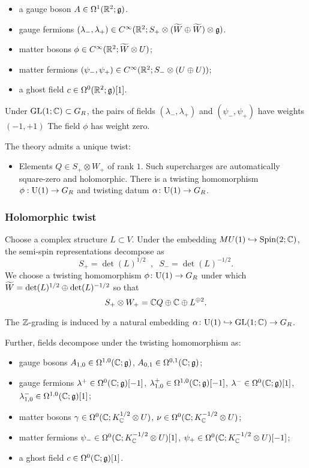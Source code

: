 \documentclass[10pt, oneside]{article}
\begin{document}
\begin{itemize}
\item a gauge boson $A \in \Omega^1(\RR^2;\fg)$.
\item gauge fermions $(\lambda_-, \lambda_+) \in C^\infty(\RR^2 ; S_+ \otimes (\Tilde{W} \oplus \Tilde{W}) \otimes \fg)$. 
\item matter bosons $\phi \in C^\infty(\RR^2 ; \Tilde{W} \otimes U)$;
\item matter fermions $(\psi_-, \psi_+) \in C^\infty(\RR^2 ; S_- \otimes (U\oplus U))$;
\item a ghost field $c \in \Omega^0(\RR^2 ; \fg)[1]$.
\end{itemize}

Under $\GL(1; \CC) \subset G_R$, the pairs of fields $(\lambda_-, \lambda_+)$ and $(\psi_-, \psi_+)$ have weights $(-1,+1)$ 
The field $\phi$ has weight zero.

The theory admits a unique twist:
\begin{itemize}
\item Elements $Q \in S_+ \otimes W_+$ of rank $1$. 
Such supercharges are automatically square-zero and holomorphic.
There is a twisting homomorphism $\phi : \U(1) \to G_R$ and twisting datum $\alpha \colon \U(1) \to G_R$. 
\end{itemize}

\subsubsection{Holomorphic twist} \label{sect:2d40minimaltwist}

Choose a complex structure $L \subset V$. 
Under the embedding $MU(1) \hookrightarrow \Spin(2; \CC)$, the semi-spin representations decompose as
\[
S_+ = \det(L)^{1/2} \;\; , \;\; S_- = \det(L)^{-1/2} .
\]
We choose a twisting homomorphism $\phi\colon \U(1) \to G_R$ under which $\Tilde{W} = \det(L)^{1/2} \oplus \det(L)^{-1/2}$
so that
\[
S_+ \otimes W_+ = \CC Q \oplus \CC \oplus L^{\oplus 2} .
\]

The $\ZZ$-grading is induced by a natural embedding $\alpha \colon \U(1) \hookrightarrow \GL(1;\CC) \to G_R$. 

Further, fields decompose under the twisting homomorphism as:
\begin{itemize}
\item gauge bosons $A_{1,0} \in \Omega^{1,0}(\CC ; \fg)$, $A_{0,1} \in \Omega^{0,1}(\CC ; \fg)$;
\item gauge fermions $\lambda^+ \in \Omega^0(\CC ; \fg)[-1]$, $\lambda^+_{1,0} \in \Omega^{1,0}(\CC ; \fg) [-1]$,  $\lambda^- \in \Omega^0(\CC ; \fg)[1]$, $\lambda^-_{1,0} \in \Omega^{1,0}(\CC ; \fg) [1]$;
\item matter bosons $\gamma \in \Omega^0(\CC ; K_{\CC}^{1/2} \otimes U)$, $\nu \in \Omega^0(\CC ; K_{\CC}^{-1/2} \otimes U)$;
\item matter fermions $\psi_- \in \Omega^{0}(\CC ; K_\CC^{-1/2} \otimes U)[1]$, $\psi_+ \in \Omega^{0}(\CC ; K_\CC^{-1/2} \otimes U)[-1]$;
\item a ghost field $c \in \Omega^0(\CC ; \fg)[1]$.
\end{itemize}
\end{document}
